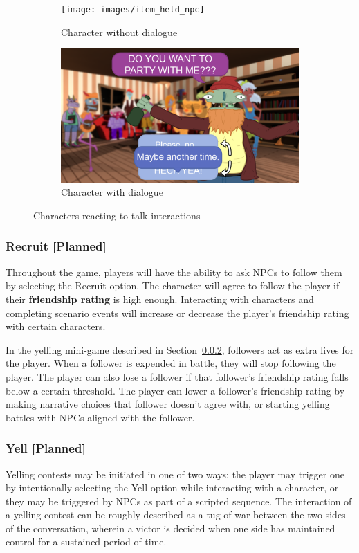 \documentclass{GlobalDocument}
\begin{document}
\begin{figure}
  \begin{subfigure}{.45\textwidth}
    \centering
    \texttt{[image: images/item\_held\_npc]}
    \caption{Character without dialogue}
	\label{fig:speech_bubble}
  \end{subfigure}%
  \begin{subfigure}{.45\textwidth}
    \centering
    \includegraphics[width=.9\linewidth]{images/ConversationUI}
    \caption{Character with dialogue}
	\label{fig:dialogue}
  \end{subfigure}%
  \caption{Characters reacting to talk interactions}
\end{figure}

\subsubsection{Recruit [Planned]}
Throughout the game, players will have the ability to ask NPCs to follow them by selecting the Recruit option. The character will agree to follow the player if their \textbf{friendship rating} is high enough. Interacting with characters and completing scenario events will increase or decrease the player's friendship rating with certain characters.

In the yelling mini-game described in Section~\ref{sec:yelling}, followers act as extra lives for the player. When a follower is expended in battle, they will stop following the player. The player can also lose a follower if that follower's friendship rating falls below a certain threshold. The player can lower a follower's friendship rating by making narrative choices that follower doesn't agree with, or starting yelling battles with NPCs aligned with the follower.

\subsubsection{Yell [Planned]}
\label{sec:yelling}
Yelling contests may be initiated in one of two ways: the player may trigger one by intentionally selecting the Yell option while interacting with a character, or they may be triggered by NPCs as part of a scripted sequence. The interaction of a yelling contest can be roughly described as a tug-of-war between the two sides of the conversation, wherein a victor is decided when one side has maintained control for a sustained period of time.
\end{document}

